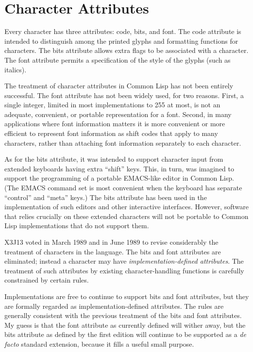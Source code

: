 \section{Character Attributes}

Every character has three attributes: code, bits, and font.
The code attribute is intended to distinguish among the printed glyphs
and formatting functions for characters.  The bits attribute allows extra
flags to be associated with a character.  The font attribute permits
a specification of the style of the glyphs (such as italics).

\begin{new}
The treatment of character attributes in Common Lisp has not been
entirely successful.  The font attribute has not been widely used,
for two reasons.  First, a single integer, limited in most
implementations to 255 at most, is not an adequate, convenient, or portable
representation for a font.  Second, in many applications where font
information matters it is more convenient or more efficient to represent
font information as shift codes that apply to many characters, rather than
attaching font information separately to each character.

As for the bits attribute, it was intended to support
character input from extended keyboards having extra ``shift'' keys.
This, in turn, was imagined to support the programming of a portable
EMACS-like editor in Common Lisp.  (The EMACS command set
is most convenient when the keyboard has separate ``control'' and
``meta'' keys.)   The bits attribute has been used in the implementation
of such editors and other interactive interfaces.  However, software
that relies crucially on these extended characters will not be portable
to Common Lisp implementations that do not support them.

X3J13 voted in March 1989 
and in June 1989 
to revise considerably the treatment
of characters in the language.  The bits and font attributes are eliminated;
instead a character may have {\it implementation-defined attributes}.
The treatment of such attributes by existing character-handling functions
is carefully constrained by certain rules.

Implementations are free to
continue to support bits and font attributes, but they are
formally regarded as implementation-defined attributes.
The rules are generally consistent with the previous
treatment of the bits and font attributes.
My guess is that
the font attribute as currently defined will wither away,
but the bits attribute as defined by the first edition will
continue to be supported as a {\it de facto} standard extension,
because it fills a useful small purpose.
\end{new}

